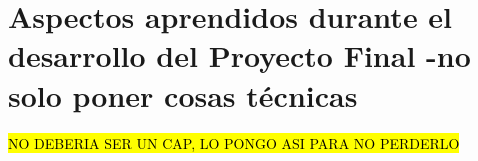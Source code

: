 \chapter{Aspectos aprendidos durante el desarrollo del Proyecto Final -no solo poner cosas técnicas}  \label{cap:alpr}

\hl{NO DEBERIA SER UN CAP, LO PONGO ASI PARA NO PERDERLO}